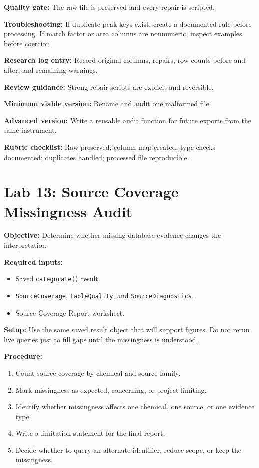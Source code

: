 \textbf{Quality gate:} The raw file is preserved and every repair is scripted.

\textbf{Troubleshooting:} If duplicate peak keys exist, create a documented rule before processing. If match factor or area columns are nonnumeric, inspect examples before coercion.

\textbf{Research log entry:} Record original columns, repairs, row counts before and after, and remaining warnings.

\textbf{Review guidance:} Strong repair scripts are explicit and reversible.

\textbf{Minimum viable version:} Rename and audit one malformed file.

\textbf{Advanced version:} Write a reusable audit function for future exports from the same instrument.

\textbf{Rubric checklist:} Raw preserved; column map created; type checks documented; duplicates handled; processed file reproducible.

\section{Lab 13: Source Coverage Missingness Audit}
\textbf{Objective:} Determine whether missing database evidence changes the interpretation.

\textbf{Required inputs:}
\begin{itemize}
  \item Saved \texttt{categorate()} result.
  \item \texttt{SourceCoverage}, \texttt{TableQuality}, and \texttt{SourceDiagnostics}.
  \item Source Coverage Report worksheet.
\end{itemize}

\textbf{Setup:} Use the same saved result object that will support figures. Do not rerun live queries just to fill gaps until the missingness is understood.

\textbf{Procedure:}
\begin{enumerate}
  \item Count source coverage by chemical and source family.
  \item Mark missingness as expected, concerning, or project-limiting.
  \item Identify whether missingness affects one chemical, one source, or one evidence type.
  \item Write a limitation statement for the final report.
  \item Decide whether to query an alternate identifier, reduce scope, or keep the missingness.
\end{enumerate}

